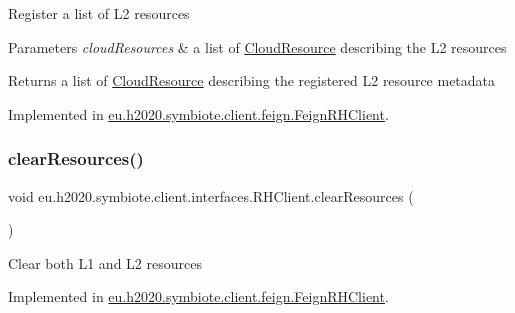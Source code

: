 Register a list of L2 resources


\begin{DoxyParams}{Parameters}
{\em cloud\+Resources} & a list of \hyperlink{}{Cloud\+Resource} describing the L2 resources \\
\hline
\end{DoxyParams}
\begin{DoxyReturn}{Returns}
a list of \hyperlink{}{Cloud\+Resource} describing the registered L2 resource metadata 
\end{DoxyReturn}


Implemented in \hyperlink{classeu_1_1h2020_1_1symbiote_1_1client_1_1feign_1_1FeignRHClient_abec39dd163ece294b6c4288a81980e10}{eu.\+h2020.\+symbiote.\+client.\+feign.\+Feign\+R\+H\+Client}.

\mbox{\label{interfaceeu_1_1h2020_1_1symbiote_1_1client_1_1interfaces_1_1RHClient_a24f46b3db8f8e4050885bb6cc6b03127}} 
\subsubsection{\texorpdfstring{clear\+Resources()}{clearResources()}}
{\footnotesize\ttfamily void eu.\+h2020.\+symbiote.\+client.\+interfaces.\+R\+H\+Client.\+clear\+Resources (\begin{DoxyParamCaption}{ }\end{DoxyParamCaption})}

Clear both L1 and L2 resources 

Implemented in \hyperlink{classeu_1_1h2020_1_1symbiote_1_1client_1_1feign_1_1FeignRHClient_adff80519c8c1228b16677a7ea1112079}{eu.\+h2020.\+symbiote.\+client.\+feign.\+Feign\+R\+H\+Client}.

\mbox{\label{interfaceeu_1_1h2020_1_1symbiote_1_1client_1_1interfaces_1_1RHClient_a9ed4582f57457a4dd4fe2bf77a6822fc}} 
